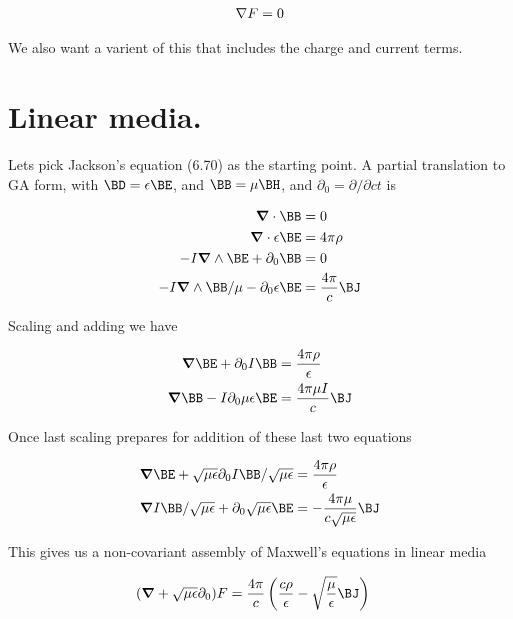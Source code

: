 \begin{align}\label{eqn:foo3}
\nabla F = 0
\end{align}

We also want a varient of this that includes the charge and current terms.

\section{Linear media.}

Lets pick Jackson's equation (6.70) as the starting point.  A partial translation to GA form, with $\BD = \epsilon \BE$, and $\BB = \mu \BH$, and $\partial_0 = \partial/\partial ct$ is

\begin{align}\label{eqn:foo4}
\spacegrad \cdot \BB &= 0 \\
\spacegrad \cdot \epsilon \BE &= 4 \pi \rho \\
-I \spacegrad \wedge \BE + \partial_0 \BB &= 0 \\
-I \spacegrad \wedge \BB/\mu - \partial_0 \epsilon \BE &= \frac{4 \pi}{c} \BJ
\end{align}

Scaling and adding we have

\begin{align}\label{eqn:foo5}
\spacegrad \BE + \partial_0 I \BB &= \frac{4 \pi \rho}{\epsilon} \\
\spacegrad \BB - I \partial_0 \mu \epsilon \BE &= \frac{4 \pi \mu I}{c} \BJ
\end{align}

Once last scaling prepares for addition of these last two equations

\begin{align}\label{eqn:foo6}
\spacegrad \BE + \sqrt{\mu\epsilon}\partial_0 I \BB/\sqrt{\mu\epsilon} &= \frac{4 \pi \rho}{\epsilon} \\
\spacegrad I \BB/\sqrt{\mu\epsilon} + \partial_0 \sqrt{\mu \epsilon} \BE &= -\frac{4 \pi \mu }{c\sqrt{\mu\epsilon}}\BJ
\end{align}

This gives us a non-covariant assembly of Maxwell's equations in linear media

\begin{align}\label{eqn:foo7}
(\spacegrad + \sqrt{\mu\epsilon}\partial_0) F &= \frac{4 \pi}{c} \left( \frac{c \rho}{\epsilon} - \sqrt{\frac{\mu}{\epsilon}} \BJ \right)
\end{align}

